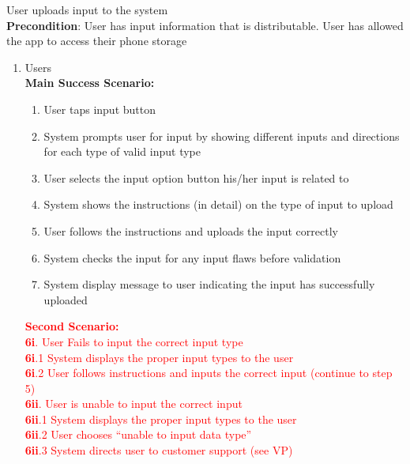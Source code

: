 \item User uploads input to the system
	\\ \textbf{Precondition}: User has input information that is distributable. User has allowed the app to access their phone storage
	\begin{enumerate}[{\bf VP1.}]
		\item Users
		\\ \textbf{Main Success Scenario:}
		\begin{enumerate}[{\bf 1.}]
			\item User taps input button 
			\item System prompts user for input by showing different inputs and directions for each type of valid input type
			\item User selects the input option button his/her input is  related to
			\item System shows the instructions (in detail) on the type of input to upload
			\item User follows the instructions and uploads the input correctly
			\item System checks the input for any input flaws before validation
			\item System display message to user indicating the input has successfully uploaded
		\end{enumerate}
		\textcolor{red}{\textbf{Second Scenario:}}\\
			\textcolor{red}{\textbf{6i}. User Fails to input the correct input type}\\
				\textcolor{red}{\hspace{1em} \textbf{6i}.1 System displays the proper input types to the user }\\
				\textcolor{red}{\hspace{1em} \textbf{6i}.2 User follows instructions and inputs the correct input (continue to step 5)}\\
			\textcolor{red}{\textbf{6ii}. User is unable to input the correct input}\\
				\textcolor{red}{\hspace{1em} \textbf{6ii}.1 System displays the proper input types to the user}\\
				\textcolor{red}{\hspace{1em} \textbf{6ii}.2 User chooses “unable to input data type”}\\
				\textcolor{red}{\hspace{1em} \textbf{6ii}.3 System directs user to customer support (see VP)}\\

\end{enumerate}
